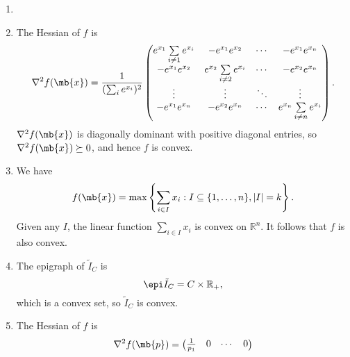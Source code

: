 \begin{exercise}
\begin{enumerate}
      \begin{solution}
        \begin{enumerate}
          \item []
          \item 
            The Hessian of $f$ is
            $$
              \nabla^2 f(\mb{x}) = \frac{1}{({\sum_i e^{x_i}})^2}\begin{pmatrix}
                e^{x_1}\sum\limits_{i\neq 1} e^{x_i} & -e^{x_1}e^{x_2}                      & \cdots & -e^{x_1}e^{x_n}                      \\
                -e^{x_1}e^{x_2}                      & e^{x_2}\sum\limits_{i\neq 2} e^{x_i} & \cdots & -e^{x_2}e^{x_n}                      \\
                \vdots                               & \vdots                               & \ddots & \vdots                               \\
                -e^{x_1}e^{x_n}                      & -e^{x_2}e^{x_n}                      & \cdots & e^{x_n}\sum\limits_{i\neq n} e^{x_i}
              \end{pmatrix}.
            $$
            $\nabla^2 f(\mb{x})$ is diagonally dominant with positive diagonal entries, so $\nabla^2 f(\mb{x}) \succeq 0$, and hence $f$ is convex.
          \item We have
            $$
              f(\mb{x}) = \max \left\{\sum_{i\in I} x_i: I\subseteq\{1,\ldots,n\}, |I|=k\right\}.
            $$
            Given any $I$, the linear function $\sum_{i\in I} x_i$ is convex on $\mathbb{R}^n$. It follows that $f$ is also convex.
          \item The epigraph of $\tilde{I}_C$ is
            $$
              \epi \tilde{I}_C = C \times \mathbb{R}_+,
            $$
            which is a convex set, so $\tilde{I}_C$ is convex.
          \item The Hessian of $f$ is
            $$
              \nabla^2 f(\mb{p}) = \begin{pmatrix}
                \frac{1}{p_1} & 0             & \cdots & 0             \\

\end{pmatrix}$$
\end{enumerate}
\end{solution}
\end{enumerate}
\end{exercise}
